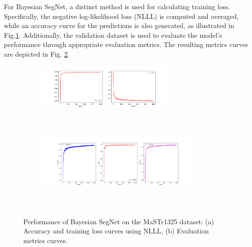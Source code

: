 For Bayesian SegNet, a distinct method is used for calculating training loss. Specifically, the negative 
log-likelihood loss (NLLL) is computed and averaged, while an accuracy curve for the predictions is also generated, 
as illustrated in Fig.\ref{fig:bs-mastr1325-tl}. Additionally, the validation dataset is used to evaluate the 
model's performance through appropriate evaluation metrics. The resulting metrics curves are depicted in Fig.
\ref{fig:bs-mastr1325-val}.
\begin{figure}[ht!]
    \centering
    \begin{subfigure}[b]{\textwidth}
        \centering
        \includegraphics[width=0.75\textwidth]{figures/MaSTr1325/trainloss-bayes.png}
        \caption{}
        \label{fig:bs-mastr1325-tl}
    \end{subfigure}
    \centering
    \begin{subfigure}[b]{\textwidth}
        \centering
        \includegraphics[height = 5cm, width=0.9\textwidth]{figures/MaSTr1325/validation-bayes.png}
        \caption{}
        \label{fig:bs-mastr1325-val}
    \end{subfigure}
    \caption{Performance of Bayesian SegNet on the MaSTr1325 dataset: 
    (a) Accuracy and training loss curves using NLLL, (b) Evaluation metrics curves.}
    \label{fig:bs-mastr1325-perf}
\end{figure}

